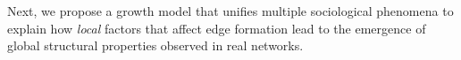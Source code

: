 
Next, we propose a growth model that unifies multiple
sociological phenomena to explain how \textit{local} factors that affect
edge formation lead to the emergence of global structural properties
observed in real networks.


%
%
